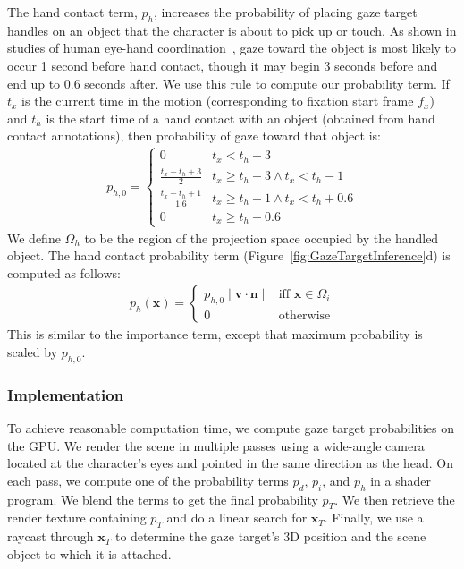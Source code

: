 The hand contact term, $p_h$, increases the probability of placing gaze target handles on an object that the character is about to pick up or touch. As shown in studies of human eye-hand coordination~\cite{johansson2001eyehead}, gaze toward the object is most likely to occur 1 second before hand contact, though it may begin 3 seconds before and end up to 0.6 seconds after. We use this rule to compute our probability term. If $t_x$ is the current time in the motion (corresponding to fixation start frame $f_x$) and $t_h$ is the start time of a hand contact with an object (obtained from hand contact annotations), then probability of gaze toward that object is:
%
\begin{align} \label{eq:GazeHandContactProbabilityTime}
p_{h,0} =
\begin{cases}
0 & t_x < t_h - 3 \\
\frac{t_x - t_h + 3}{2} & t_x \geq t_h - 3 \wedge t_x < t_h - 1 \\
\frac{t_x - t_h + 1}{1.6} & t_x \geq t_h - 1 \wedge t_x < t_h + 0.6 \\
0 & t_x \geq t_h + 0.6
\end{cases}
\end{align}
%
We define $\Omega_h$ to be the region of the projection space occupied by the handled object. The hand contact probability term (Figure~\ref{fig:GazeTargetInference}d) is computed as follows:
%
\begin{align} \label{eq:GazeHandContactProbability}
p_h(\mathbf{x}) =
\begin{cases}
p_{h,0} \mid \mathbf{v} \cdot \mathbf{n} \mid & \text{iff } \mathbf{x} \in \Omega_i  \\
0 & \text{otherwise}
\end{cases}
\end{align}
%
This is similar to the importance term, except that maximum probability is scaled by $p_{h,0}$.

\subsubsection{Implementation}

To achieve reasonable computation time, we compute gaze target probabilities on the GPU. We render the scene in multiple passes using a wide-angle camera located at the character's eyes and pointed in the same direction as the head. On each pass, we compute one of the probability terms $p_d$, $p_i$, and $p_h$ in a shader program. We blend the terms to get the final probability $p_T$. We then retrieve the render texture containing $p_T$ and do a linear search for $\mathbf{x}_T$. Finally, we use a raycast through $\mathbf{x}_T$ to determine the gaze target's 3D position and the scene object to which it is attached.

